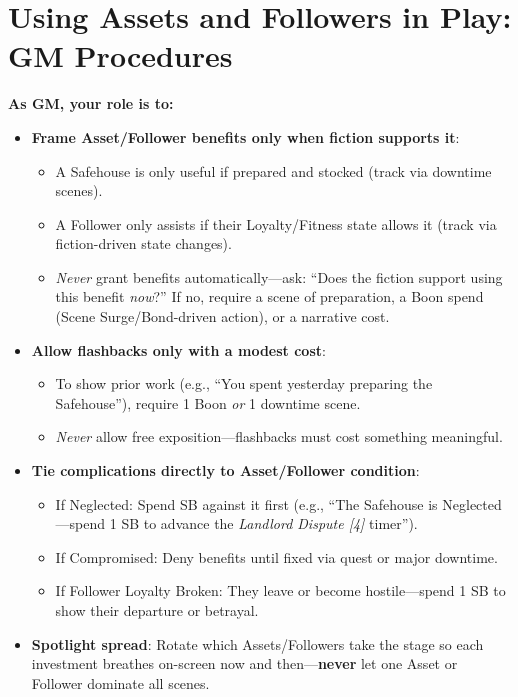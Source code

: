 \section{Using Assets and Followers in Play: GM Procedures}
\label{sec:using-assets-followers}
\textbf{As GM, your role is to:}  
\begin{itemize}
  \item \textbf{Frame Asset/Follower benefits only when fiction supports it}:  
        \begin{itemize}
          \item A Safehouse is only useful if prepared and stocked (track via downtime scenes).  
          \item A Follower only assists if their Loyalty/Fitness state allows it (track via fiction-driven state changes).  
          \item \textit{Never} grant benefits automatically---ask: ``Does the fiction support using this benefit \emph{now}?'' If no, require a scene of preparation, a Boon spend (Scene Surge/Bond-driven action), or a narrative cost.  
        \end{itemize}
  \item \textbf{Allow flashbacks only with a modest cost}:  
        \begin{itemize}
          \item To show prior work (e.g., ``You spent yesterday preparing the Safehouse''), require 1 Boon \emph{or} 1 downtime scene.  
          \item \textit{Never} allow free exposition---flashbacks must cost something meaningful.  
        \end{itemize}
  \item \textbf{Tie complications directly to Asset/Follower condition}:  
        \begin{itemize}
          \item If Neglected: Spend SB against it first (e.g., ``The Safehouse is Neglected---spend 1 SB to advance the \emph{Landlord Dispute [4]} timer'').  
          \item If Compromised: Deny benefits until fixed via quest or major downtime.  
          \item If Follower Loyalty Broken: They leave or become hostile---spend 1 SB to show their departure or betrayal.  
        \end{itemize}
  \item \textbf{Spotlight spread}: Rotate which Assets/Followers take the stage so each investment breathes on-screen now and then---\textbf{never} let one Asset or Follower dominate all scenes.  

\end{itemize}
